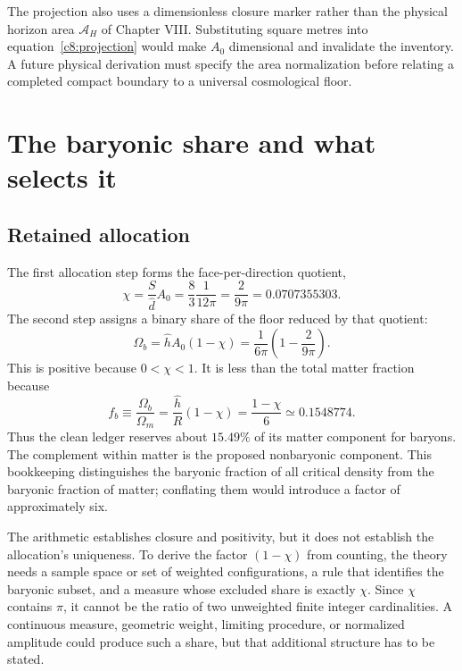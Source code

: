 The projection also uses a dimensionless closure marker rather than the physical horizon area $\mathcal A_H$ of Chapter VIII. Substituting square metres into equation~\eqref{c8:projection} would make $A_0$ dimensional and invalidate the inventory. A future physical derivation must specify the area normalization before relating a completed compact boundary to a universal cosmological floor.

\section{The baryonic share and what selects it}
\subsection{Retained allocation}
The first allocation step forms the face-per-direction quotient,
\begin{equation}
 \chi=\frac{S}{\widehat d}A_0
 =\frac{8}{3}\frac1{12\pi}
 =\frac2{9\pi}=0.0707355303.
 \label{c8:chi}
\end{equation}
The second step assigns a binary share of the floor reduced by that quotient:
\begin{equation}
 \Omega_b=\widehat hA_0(1-\chi)
 =\frac1{6\pi}\left(1-\frac2{9\pi}\right).
 \label{c8:baryonclosed}
\end{equation}
This is positive because $0<\chi<1$. It is less than the total matter fraction because
\begin{equation}
 f_b\equiv\frac{\Omega_b}{\Omega_m}
 =\frac{\widehat h}{R}(1-\chi)
 =\frac{1-\chi}{6}\simeq0.1548774.
 \label{c8:fb}
\end{equation}
Thus the clean ledger reserves about $15.49\%$ of its matter component for baryons. The complement within matter is the proposed nonbaryonic component. This bookkeeping distinguishes the baryonic fraction of all critical density from the baryonic fraction of matter; conflating them would introduce a factor of approximately six.

The arithmetic establishes closure and positivity, but it does not establish the allocation's uniqueness. To derive the factor $(1-\chi)$ from counting, the theory needs a sample space or set of weighted configurations, a rule that identifies the baryonic subset, and a measure whose excluded share is exactly $\chi$. Since $\chi$ contains $\pi$, it cannot be the ratio of two unweighted finite integer cardinalities. A continuous measure, geometric weight, limiting procedure, or normalized amplitude could produce such a share, but that additional structure has to be stated.

